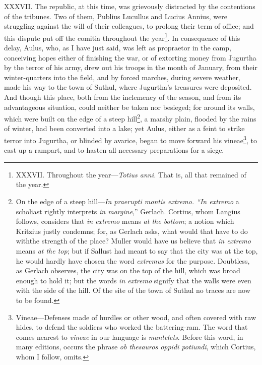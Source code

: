 XXXVII. The republic, at this time, was grievously distracted by the
contentions of the tribunes. Two of them, Publius Lucullus and Lucius
Annius, were struggling against the will of their colleagues, to
prolong their term of office; and this dispute put off the comitia
throughout the year\footnote{XXXVII. Throughout the year—\emph{Totius anni.} That is, all that
remained of the year.}. In consequence of this delay, Aulus, who, as
I have just said, was left as propraetor in the camp, conceiving hopes
either of finishing the war, or of extorting money from Jugurtha by
the terror of his army, drew out his troops in the month of January,
from their winter-quarters into the field, and by forced marches,
during severe weather, made his way to the town of Suthul, where
Jugurtha's treasures were deposited. And though this place, both from
the inclemency of the season, and from its advantageous situation,
could neither be taken nor besieged; for around its walls, which were
built on the edge of a steep hill\footnote{On the edge of a steep hill—\emph{In praerupti montis extremo.
``In extremo} a scholiast rightly interprets \emph{in margine},'' Gerlach.
Cortius, whom Langius follows, considers that \emph{in extremo} means \emph{at
the bottom}; a notion which Kritzius justly condemns; for, as Gerlach
asks, what would that have to do withthe strength of the place? Muller
would have us believe that \emph{in extremo} means \emph{at the top}; but if
Sallust had meant to say that the city was at the top, he would hardly
have chosen the word \emph{extremus} for the purpose. Doubtless, as Gerlach
observes, the city was on the top of the hill, which was broad enough
to hold it; but the words \emph{in extremo} signify that the walls were
even with the side of the hill. Of the site of the town of Suthul no
traces are now to be found.}, a marshy plain, flooded by the
rains of winter, had been converted into a lake; yet Aulus, either as
a feint to strike terror into Jugurtha, or blinded by avarice, began
to move forward his vineae\footnote{Vineae—Defenses made of hurdles or other wood, and often
covered with raw hides, to defend the soldiers who worked the
battering-ram. The word that comes nearest to \emph{vineae} in our language
is \emph{mantelets}. Before this word, in many editions, occurs the phrase
\emph{ob thesauros oppidi potiundi}, which Cortius, whom I follow, omits.}, to cast up a rampart, and to hasten
all necessary preparations for a siege.

